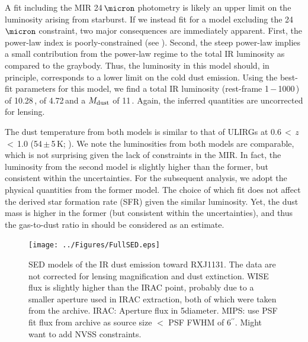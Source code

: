 \documentclass[]{emulateapj}
\begin{document}
A fit including the MIR 24\,$\micron$ photometry
is likely an upper limit on the \fir luminosity arising from starburst.
If we instead fit for a model excluding the 24\,$\micron$ constraint,
two major consequences are immediately apparent.
First, the power-law index is poorly-constrained (see ).
Second, the steep power-law implies a small contribution
from the power-law regime
to the total IR luminosity as compared to the graybody.
Thus, the \fir luminosity in
this model should, in principle, corresponds to a
lower limit on the cold dust emission.
Using the best-fit parameters
for this model, we find a total IR luminosity
\LIR (rest-frame 1\,$-$\,1000\,\micron) of 10.28\,\Lsun,
\LFIR of 4.72\,\Lsun and a $M_{\rm dust}$ of 11\,\Msun.
Again, the inferred quantities are uncorrected for lensing.

The dust temperature from both models is similar to that of
ULIRGs at 0.6\,$<$\,$z$\,$<$\,1.0 (54\,$\pm$\,5\,K; \citealt[hereafter C13]{Combes13a}).
We note the \fir luminosities from both models are comparable, which is
not surprising given the lack of constraints in the MIR. In fact, the
\fir luminosity from the second model is slightly higher than the former, but
consistent within the uncertainties.
For the subsequent analysis, we adopt the physical quantities
from the former model. The choice of which fit does not affect
the derived star formation rate (SFR) given the similar \fir luminosity.
Yet, the dust mass is higher in the former (but consistent within the
uncertainties), and thus the gas-to-dust ratio in 
should be considered as an estimate.

\begin{figure}[!htbp]
\centering
\texttt{[image: ../Figures/FullSED.eps]}
\caption{SED models of the IR dust emission toward RXJ1131.
The data are not corrected for lensing magnification and dust extinction.
WISE flux is slightly higher than the IRAC point, probably due to a smaller
aperture used in IRAC extraction,
both of which were taken from the archive.
IRAC: Aperture flux in 5\farcs diameter.
MIPS: use PSF fit flux from archive as source size $<$ PSF FWHM of 6$^{\prime\prime}$.
Might want to add NVSS constraints.
\label{fig:SED}}
\end{figure}
\end{document}

